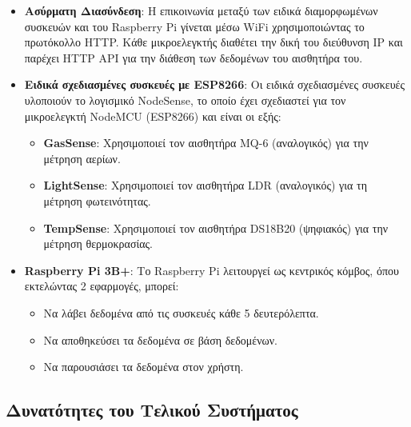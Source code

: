 \documentclass[conference]{IEEEtran}
\begin{document}
\begin{itemize}
	\item \textbf{Ασύρματη Διασύνδεση}:  
	      Η επικοινωνία μεταξύ των ειδικά διαμορφωμένων συσκευών και του Raspberry Pi γίνεται μέσω WiFi χρησιμοποιώντας το πρωτόκολλο HTTP. Κάθε μικροελεγκτής διαθέτει την δική του διεύθυνση IP και παρέχει HTTP API για την διάθεση των δεδομένων του αισθητήρα του.
	      	      
	\item \textbf{Ειδικά σχεδιασμένες συσκευές με ESP8266}:  
	      Οι ειδικά σχεδιασμένες συσκευές υλοποιούν το λογισμικό NodeSense, το οποίο έχει σχεδιαστεί για τον μικροελεγκτή NodeMCU (ESP8266) και είναι οι εξής:
	      \begin{itemize}
	      	\item \textbf{GasSense}: Χρησιμοποιεί τον αισθητήρα MQ-6 (αναλογικός) για την μέτρηση αερίων.
	      	\item \textbf{LightSense}: Χρησιμοποιεί τον αισθητήρα LDR (αναλογικός) για τη μέτρηση φωτεινότητας.
	      	\item \textbf{TempSense}: Χρησιμοποιεί τον αισθητήρα DS18B20 (ψηφιακός) για την μέτρηση θερμοκρασίας.
	      \end{itemize}
	      	      
	\item \textbf{Raspberry Pi 3B+}:  
	      Το Raspberry Pi λειτουργεί ως κεντρικός κόμβος, όπου εκτελώντας 2 εφαρμογές, μπορεί:
	      \begin{itemize}
	      	\item Να λάβει δεδομένα από τις συσκευές κάθε 5 δευτερόλεπτα.
	      	\item Να αποθηκεύσει τα δεδομένα σε βάση δεδομένων.
	      	\item Να παρουσιάσει τα δεδομένα στον χρήστη.
	      \end{itemize}
\end{itemize}

\subsection{Δυνατότητες του Τελικού Συστήματος}
\end{document}

